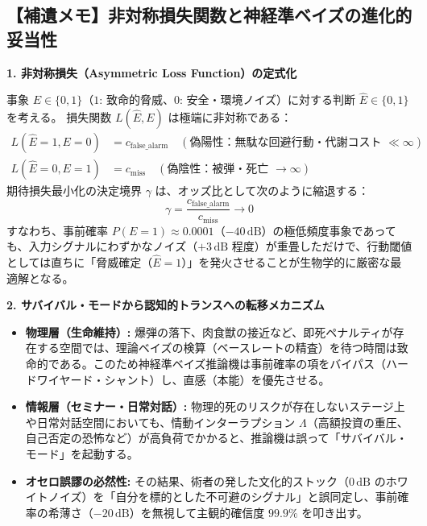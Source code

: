 \subsection*{【補遺メモ】非対称損失関数と神経準ベイズの進化的妥当性}
\label{note:asymmetric_loss_evolutionary_bayes}

\begin{tcolorbox}[colback=gray!5,colframe=black!75,title=設計ノート：なぜ推論機は事前確率を切り捨てるのか]
\small
\textbf{1. 非対称損失（Asymmetric Loss Function）の定式化}

事象 $E \in \{0, 1\}$（$1$: 致命的脅威、$0$: 安全・環境ノイズ）に対する判断 $\hat{E} \in \{0, 1\}$ を考える。
損失関数 $L(\hat{E}, E)$ は極端に非対称である：
\begin{align}
    L(\hat{E}=1, E=0) &= c_{\text{false\_alarm}} \quad (\text{偽陽性：無駄な回避行動・代謝コスト $\ll \infty$}) \\
    L(\hat{E}=0, E=1) &= c_{\text{miss}} \quad (\text{偽陰性：被弾・死亡 $\to \infty$})
\end{align}
期待損失最小化の決定境界 $\gamma$ は、オッズ比として次のように縮退する：
\begin{equation}
    \gamma = \frac{c_{\text{false\_alarm}}}{c_{\text{miss}}} \to 0
\end{equation}
すなわち、事前確率 $P(E=1) \approx 0.0001$（$-40\,\text{dB}$）の極低頻度事象であっても、入力シグナルにわずかなノイズ（$+3\,\text{dB}$ 程度）が重畳しただけで、行動閾値としては直ちに「脅威確定（$\hat{E}=1$）」を発火させることが生物学的に厳密な最適解となる。
\vspace{0.5em}

\textbf{2. サバイバル・モードから認知的トランスへの転移メカニズム}
\begin{itemize}
    \item \textbf{物理層（生命維持）:} 爆弾の落下、肉食獣の接近など、即死ペナルティが存在する空間では、理論ベイズの検算（ベースレートの精査）を待つ時間は致命的である。このため神経準ベイズ推論機は事前確率の項をバイパス（ハードワイヤード・シャント）し、直感（本能）を優先させる。
    \item \textbf{情報層（セミナー・日常対話）:} 物理的死のリスクが存在しないステージ上や日常対話空間においても、情動インターラプション $\Lambda$（高額投資の重圧、自己否定の恐怖など）が高負荷でかかると、推論機は誤って「サバイバル・モード」を起動する。
    \item \textbf{オセロ誤謬の必然性:} その結果、術者の発した文化的ストック（$0\,\text{dB}$ のホワイトノイズ）を「自分を標的とした不可避のシグナル」と誤同定し、事前確率の希薄さ（$-20\,\text{dB}$）を無視して主観的確信度 $99.9\%$ を叩き出す。
\end{itemize}
\vspace{0.5em}


\end{tcolorbox}
